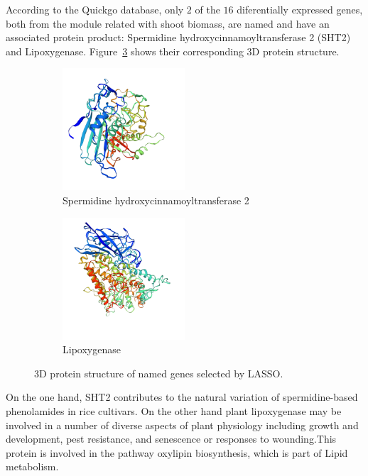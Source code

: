 \documentclass[12pt,journal, onecolumn]{IEEEtran}
\begin{document}
According to the Quickgo database, only $2$ of the $16$ diferentially expressed genes, both from the module related with shoot biomass, are named and have an associated protein product: Spermidine hydroxycinnamoyltransferase 2 (SHT2) and Lipoxygenase. Figure~\ref{fig:3d} shows their corresponding 3D protein structure.

\begin{figure}[h]
\centering
   \begin{subfigure}{0.49\linewidth} \centering
     \includegraphics[width=0.5\textwidth]{Figures/structure_LOC_Os12g27254.png}
     \caption{Spermidine hydroxycinnamoyltransferase 2}\label{fig:structure_SHT2}
   \end{subfigure}
   \begin{subfigure}{0.49\linewidth} \centering
     \includegraphics[width=0.5\textwidth]{Figures/structure_LOC_Os12g37260.png}
     \caption{Lipoxygenase}\label{fig:structure_Lipoxygenase}
   \end{subfigure}
\caption{3D protein structure of named genes selected by LASSO.} \label{fig:3d}
\end{figure}

On the one hand, SHT2 contributes to the natural variation of spermidine-based phenolamides in rice cultivars. On the other hand plant lipoxygenase may be involved in a number of diverse aspects of plant physiology including growth and development, pest resistance, and senescence or responses to wounding.This protein is involved in the pathway oxylipin biosynthesis, which is part of Lipid metabolism.\\
\end{document}
